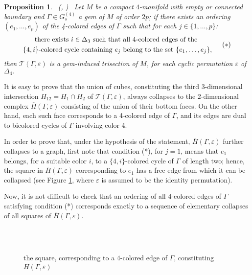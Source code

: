 \documentclass[12pt,a4paper]{article}
\newtheorem{proposition}[lemma]{Proposition}
\newcommand{\qed}{\\ \rightline{$\Box$ \ \ \ \ \ \ \ \ \ \ \ \ \ \ \ }\\}
\newcommand{\e}{\varepsilon}
\newcommand{\G}{\Gamma}
\begin{document}
\begin{proposition} \label{CS gem-induced trisections} \ {\rm (\cite{Casali-Cristofori gem-induced}, \cite{Casali-Cristofori trisection bis})} \ 
Let $M$ be a compact $4$-manifold with empty or connected boundary and $\G\in G_s^{(4)}$ a gem of $M$ of order $2p$;  if  there exists an ordering $(e_1,\ldots,e_p)$ of the 4-colored edges of $\G$ such that for each $j\in\{1,\ldots,p\}$:
$$\begin{aligned} \text{there exists } i\in\Delta_3 \text{ such that} & \ \text{all 4-colored edges of  the }  \\ \{4,i\}\text{-colored cycle} \ \text{containing } e_j  & \ \text{belong to the set }\{e_1,\ldots,e_j\},\end{aligned}\hskip 15pt (*)$$     
then $\mathcal T(\G, \varepsilon)$ is a gem-induced trisection of $M$, for each cyclic permutation $\e$ of $\Delta_4.$       
\end{proposition} 

\medskip

\par \noindent 
It is easy to prove that the union of cubes, constituting the third 3-dimensional intersection $H_{12}=H_1\cap H_2$ of $\mathcal T(\G, \varepsilon)$, always collapses to the $2$-dimensional complex  $\overline H(\G,\varepsilon)$ consisting of the union of their bottom faces.  
On the other hand, each such face corresponds to a 4-colored edge of $\Gamma$, and its edges are dual to bicolored cycles of $\Gamma$ involving color 4. 

In order to prove that, under the hypothesis of the statement, $\overline H(\G,\varepsilon)$ further collapses to a graph, first note that condition (*), for $j=1$, means that $e_1$ belongs,  for a suitable color $i$, to a $\{4,i\}$-colored cycle of $\G$ of length two;  hence, the square  in $\overline H(\G,\varepsilon)$ corresponding  to $e_1$ has a free edge from which it can be collapsed (see Figure \ref{figHsquare}, where $\e$ is assumed to be the identity permutation).  

Now, it is not difficult to check that an ordering of all $4$-colored edges of $\G$  satisfying condition (*) corresponds exactly to a sequence of elementary collapses of all squares of $\overline H(\G,\varepsilon)$. 

\ \qed 

\begin{figure}[h!]
\centering
{}
\caption{the square, corresponding to a $4$-colored edge of $\G$, constituting $\overline H(\G,\varepsilon)$}
\label{figHsquare}
\end{figure}
\end{document}

